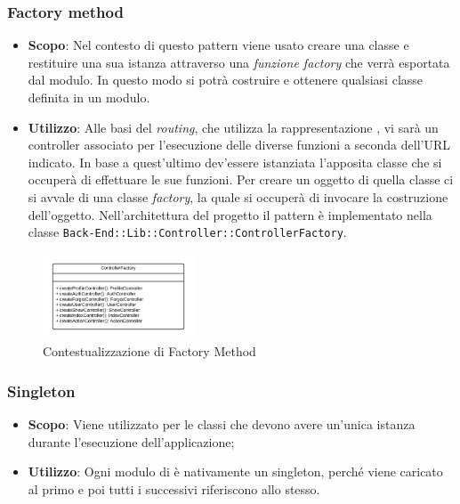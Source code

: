 \subsubsection{Factory method}

\begin{itemize}

	\item \textbf{Scopo}: Nel contesto di  questo pattern viene usato creare una classe e restituire una sua istanza attraverso una \textit{funzione factory} che verrà esportata dal modulo. In questo modo si potrà costruire e ottenere qualsiasi classe definita in un modulo.
	\item \textbf{Utilizzo}: Alle basi del \textit{routing}, che utilizza la rappresentazione , vi sarà un controller associato per l'esecuzione delle diverse funzioni a seconda dell'URL indicato. In base a quest'ultimo dev'essere istanziata l'apposita classe che si occuperà di effettuare le sue funzioni. Per creare un oggetto di quella classe ci si avvale di una classe \textit{factory}, la quale si occuperà di invocare la costruzione dell'oggetto. Nell'architettura del progetto il pattern è implementato nella classe \texttt{Back-End::Lib::Controller::ControllerFactory}.

\end{itemize}

\begin{figure}[H]
\centering \includegraphics[width=0.4\textwidth]{patterns/contestualizzazione/factory-method.png}
\caption{Contestualizzazione di Factory Method}
\label{fig:mvc}
\end{figure}

\subsubsection{Singleton}

\begin{itemize}

	\item \textbf{Scopo}: Viene utilizzato per le classi che devono avere un'unica istanza durante l'esecuzione dell'applicazione;
	\item \textbf{Utilizzo}: Ogni modulo di  è nativamente un singleton, perché viene caricato al primo  e poi tutti i successivi riferiscono allo stesso.

\end{itemize}

